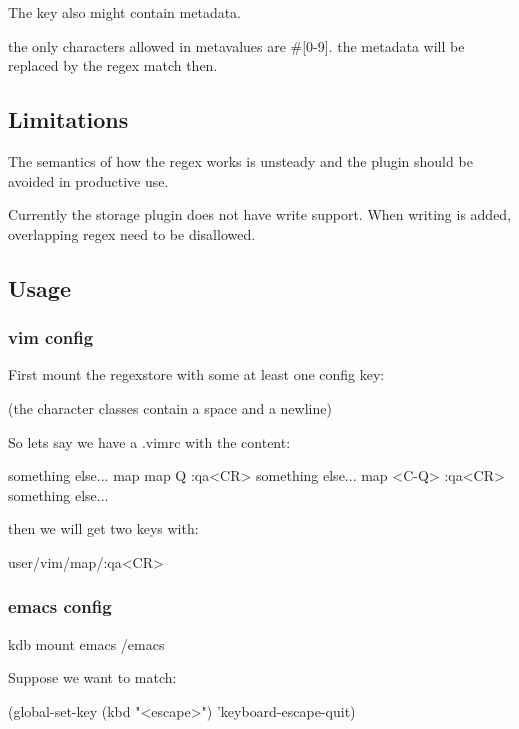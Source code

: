 The key also might contain metadata.


\begin{DoxyItemize}
\item the only characters allowed in metavalues are \textquotesingle{}\#\mbox{[}0-\/9\mbox{]}\textquotesingle{}. the metadata will be replaced by the regex match then.
\end{DoxyItemize}

\subsection*{Limitations}

The semantics of how the regex works is unsteady and the plugin should be avoided in productive use.

Currently the storage plugin does not have write support. When writing is added, overlapping regex need to be disallowed.

\subsection*{Usage}

\subsubsection*{vim config}

First mount the regexstore with some at least one config key\+: 


(the character classes contain a space and a newline)

So lets say we have a .vimrc with the content\+: \begin{DoxyVerb}something else...
map map Q :qa<CR>
something else...
map <C-Q> :qa<CR>
something else...
\end{DoxyVerb}


then we will get two keys with\+: \begin{DoxyVerb}user/vim/map/:qa<CR>
\end{DoxyVerb}


\subsubsection*{emacs config}

\begin{DoxyVerb}kdb mount emacs /emacs
\end{DoxyVerb}


Suppose we want to match\+: \begin{DoxyVerb}(global-set-key (kbd "<escape>")      'keyboard-escape-quit)\end{DoxyVerb}
 